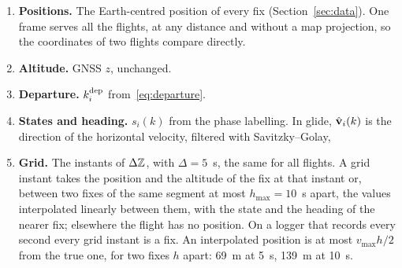 \begin{enumerate}[label=(\alph*), leftmargin=2em]
\item \textbf{Positions.} The Earth-centred position of every fix (Section~\ref{sec:data}). One
frame serves all the flights, at any distance and without a map projection, so the coordinates of
two flights compare directly.

\item \textbf{Altitude.} GNSS $z$, unchanged.

\item \textbf{Departure.} $k^{\mathrm{dep}}_i$ from~\eqref{eq:departure}.

\item \textbf{States and heading.} $s_i(k)$ from the phase labelling. In glide, $\hat{\mathbf{v}}_i(k)$ is the
direction of the horizontal velocity, filtered with Savitzky--Golay, 

\item \textbf{Grid.} The instants of $\Delta\mathbb{Z}$, with $\Delta=5$~s, the same for all flights. A
grid instant takes the position and the altitude of the fix at that instant or, between two fixes
of the same segment at most $h_{\max}=10$~s apart, the values interpolated linearly between them,
with the state and the heading of the nearer fix; elsewhere the flight has no position. On a
logger that records every second every grid instant is a fix. An interpolated position is at most
$v_{\max}h/2$ from the true one, for two fixes $h$ apart: 69~m at 5~s, 139~m at 10~s.
\end{enumerate}

